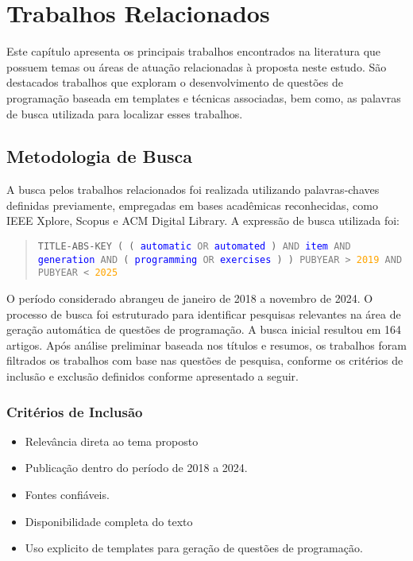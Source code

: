 
\chapter{Trabalhos Relacionados}\label{cap:trabalhos-relacionados}

Este capítulo apresenta os principais trabalhos encontrados na literatura que possuem temas ou áreas de atuação relacionadas à proposta neste estudo. São destacados trabalhos que exploram o desenvolvimento de questões de programação baseada em templates e técnicas associadas, bem como, as palavras de busca utilizada para localizar esses trabalhos.

\section{Metodologia de Busca}

A busca pelos trabalhos relacionados foi realizada utilizando palavras-chaves definidas previamente, empregadas em bases acadêmicas reconhecidas, como IEEE Xplore, Scopus e ACM Digital Library. A expressão de busca utilizada foi: 

\begin{quote}
\texttt{TITLE-ABS-KEY ( ( \textcolor{blue}{automatic} \textcolor{gray}{OR} \textcolor{blue}{automated} ) \textcolor{gray}{AND} \textcolor{blue}{item} \textcolor{gray}{AND} \textcolor{blue}{generation} \textcolor{gray}{AND} ( \textcolor{blue}{programming} \textcolor{gray}{OR} \textcolor{blue}{exercises} ) ) \textcolor{gray}{PUBYEAR >} \textcolor{orange}{2019} \textcolor{gray}{AND} \textcolor{gray}{PUBYEAR <} \textcolor{orange}{2025}}
\end{quote}

O período considerado abrangeu de janeiro de 2018 a novembro de 2024.  O processo de busca foi estruturado para identificar pesquisas relevantes na área de geração automática de questões de programação. A busca inicial resultou em 164 artigos. Após análise preliminar baseada nos títulos e resumos, os trabalhos foram filtrados  os trabalhos com base nas questões de pesquisa, conforme os critérios de inclusão e exclusão definidos conforme apresentado a seguir. 

\subsection{Critérios de Inclusão}
\begin{itemize}
    \item Relevância direta ao tema proposto
    \item Publicação dentro do período de 2018 a 2024.
    \item Fontes confiáveis.
    \item Disponibilidade completa do texto
    \item Uso explicito de templates para geração de questões de programação.
\end{itemize}
